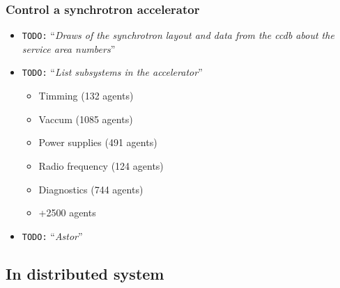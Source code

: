 \documentclass{beamer}
\newcommand{\todo}[1]{\texttt{\color{red}TODO:} ``\emph{#1}''}
\begin{document}
\begin{frame}
\frametitle{Control a synchrotron accelerator}
     \begin{itemize}
         \item \todo{Draws of the synchrotron layout and data from the ccdb about the service area numbers}
         \item \todo{List subsystems in the accelerator}
         \begin{itemize}
              \item Timming (132 agents)
              \item Vaccum (1085 agents)
              \item Power supplies (491 agents)
              \item Radio frequency (124 agents)
              \item Diagnostics (744 agents)
              \item<1-|alert@1> +2500 agents
         \end{itemize}
         \item \todo{Astor}
     \end{itemize}
\end{frame}

\subsection{In distributed system}
\end{document}
